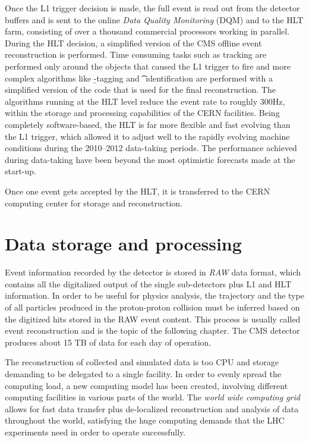 Once the L1 trigger decision is made, the full event is read out from the detector buffers and is sent to the online \emph{Data Quality Monitoring} (DQM) and to the HLT farm, consisting of over a thousand commercial processors working in parallel. During the HLT decision, a simplified version of the CMS offline event reconstruction is performed. Time consuming tasks such as tracking are performed only around the objects that caused the L1 trigger to fire and more complex algorithms like \b-tagging and \t~identification are performed with a simplified version of the code that is used for the final reconstruction. 
The algorithms running at the HLT level %
reduce the event rate to roughly 300Hz, within the storage and processing capabilities of the CERN facilities. Being completely software-based, the HLT is far more flexible and fast evolving than the L1 trigger, which allowed it to adjust well to the rapidly evolving machine conditions during the 2010--2012 data-taking periods. The performance achieved during data-taking have been beyond the most optimistic forecasts made at the start-up.

Once one event gets accepted by the HLT, it is transferred to the CERN computing center for storage and reconstruction.

\section{Data storage and processing}

Event information recorded by the detector is stored in \emph{RAW} data format, which contains all the digitalized output of the single sub-detectors plus L1 and HLT information. In order to be useful for physics analysis, the trajectory and the type of all particles produced in the proton-proton collision must be inferred based on the digitized hits stored in the RAW event content. This process is usually called event reconstruction and is the topic of the following chapter. The CMS detector produces about 15 TB of data for each day of operation.

The reconstruction of collected and simulated data is too CPU and storage demanding to be delegated to a single facility. In order to evenly spread the computing load, a new computing model has been created, involving different computing facilities in various parts of the world. The \emph{world wide computing grid} \cite{Malecki:2005gn} allows for fast data transfer plus de-localized reconstruction and analysis of data throughout the world, satisfying the huge computing demands that the LHC experiments need in order to operate successfully. 

